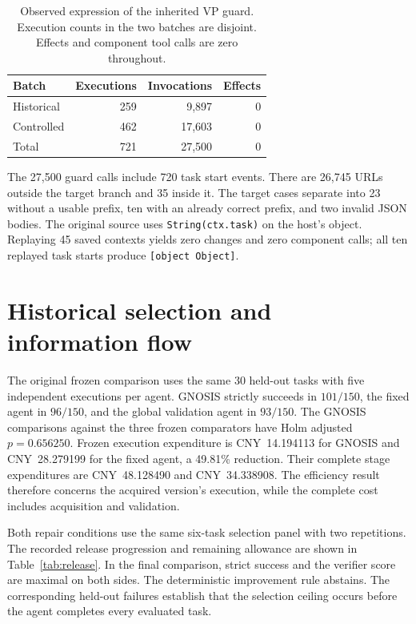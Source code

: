 \documentclass{ecai}
\begin{document}
\begin{table}[t]
\centering
\caption{Observed expression of the inherited VP guard. Execution counts in the two batches are disjoint. Effects and component tool calls are zero throughout.}
\label{tab:guard}
\small
\renewcommand{\arraystretch}{1.13}
\begin{tabular*}{\columnwidth}{@{\extracolsep{\fill}}lrrr@{}}
\toprule
Batch & Executions & Invocations & Effects\\
\midrule
Historical & 259 & 9,897 & 0\\
Controlled & 462 & 17,603 & 0\\
\midrule
Total & 721 & 27,500 & 0\\
\bottomrule
\end{tabular*}
\end{table}

The 27,500 guard calls include 720 task start events. There are 26,745 URLs outside the target branch and 35 inside it. The target cases separate into 23 without a usable prefix, ten with an already correct prefix, and two invalid JSON bodies. The original source uses \texttt{String(ctx.task)} on the host's object. Replaying 45 saved contexts yields zero changes and zero component calls; all ten replayed task starts produce \texttt{[object Object]}.

\section{Historical selection and information flow}
\label{sec:history-controls}

The original frozen comparison uses the same 30 held-out tasks with five independent executions per agent. GNOSIS strictly succeeds in $101/150$, the fixed agent in $96/150$, and the global validation agent in $93/150$. The GNOSIS comparisons against the three frozen comparators have Holm adjusted $p=0.656250$. Frozen execution expenditure is CNY~14.194113 for GNOSIS and CNY~28.279199 for the fixed agent, a 49.81\% reduction. Their complete stage expenditures are CNY~48.128490 and CNY~34.338908. The efficiency result therefore concerns the acquired version's execution, while the complete cost includes acquisition and validation.

Both repair conditions use the same six-task selection panel with two repetitions. The recorded release progression and remaining allowance are shown in Table~\ref{tab:release}. In the final comparison, strict success and the verifier score are maximal on both sides. The deterministic improvement rule abstains. The corresponding held-out failures establish that the selection ceiling occurs before the agent completes every evaluated task.
\end{document}

